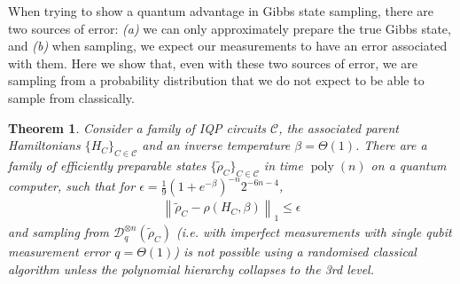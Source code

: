 \documentclass[a4paper,onecolumn,11pt,accepted=2017-05-09]{quantumarticle}
\newcommand{\norm}[1]{\left\lVert#1\right\rVert}
\newcommand{\cD}{\mathcal{D}}
\newcommand{\trho}{\tilde{\rho}}
\DeclareMathOperator{\poly}{poly}
\newtheorem{theorem}{Theorem}
\begin{document}
 When trying to show a quantum advantage in Gibbs state sampling, there are two sources of error: \textit{(a)} we can only approximately prepare the true Gibbs state, and \textit{(b)} when sampling, we expect our measurements to have an error associated with them.
	Here we show that, even with these two sources of error, we are sampling from a probability distribution that we do not expect to be able to sample from classically.
 \begin{theorem}
		Consider a family of IQP circuits $\mathcal{C}$, the associated parent Hamiltonians $\{H_C\}_{C\in\mathcal{C}}$ and an inverse temperature $\beta=\Theta(1)$. 
		There are a family of efficiently preparable states $\{\trho_C\}_{C\in \mathcal{C}}$ in time $\poly(n)$ on a quantum computer, such that for $\epsilon =\frac{1}{9} (1+e^{-\beta})^{-n}2^{-6n-4}$,
		\begin{align*}
			\norm{\trho_C - \rho(H_C,\beta)}_1\leq \epsilon
		\end{align*}
		and sampling from $\cD_q^{\otimes n}(\trho_C)$ (i.e. with imperfect measurements with single qubit measurement error $q = \Theta(1)$) is not possible using a randomised classical algorithm unless the polynomial hierarchy collapses to the 3rd level.
	\end{theorem}
\end{document}
